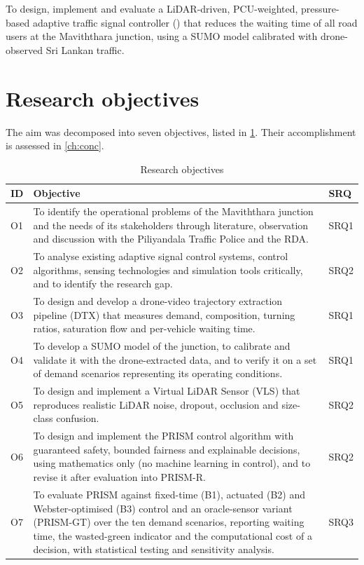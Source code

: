 To design, implement and evaluate a LiDAR-driven, PCU-weighted, pressure-based adaptive traffic signal controller (\prism{}) that reduces the waiting time of all road users at the Maviththara junction, using a SUMO model calibrated with drone-observed Sri Lankan traffic.

\section{Research objectives}\label{sec:intro-objectives}

The aim was decomposed into seven objectives, listed in \cref{tab:intro-objectives}. Their accomplishment is assessed in \cref{ch:conc}.

\begin{table}[htbp]
  \centering
  \caption{Research objectives}
  \label{tab:intro-objectives}
  \small
  \renewcommand{\arraystretch}{1.15}
  \begin{tabularx}{\textwidth}{@{}l X l@{}}
    \toprule
    \textbf{ID} & \textbf{Objective} & \textbf{SRQ} \\
    \midrule
    O1 & To identify the operational problems of the Maviththara junction and the needs of its stakeholders through literature, observation and discussion with the Piliyandala Traffic Police and the RDA. & SRQ1 \\
    O2 & To analyse existing adaptive signal control systems, control algorithms, sensing technologies and simulation tools critically, and to identify the research gap. & SRQ2 \\
    O3 & To design and develop a drone-video trajectory extraction pipeline (DTX) that measures demand, composition, turning ratios, saturation flow and per-vehicle waiting time. & SRQ1 \\
    O4 & To develop a SUMO model of the junction, to calibrate and validate it with the drone-extracted data, and to verify it on a set of demand scenarios representing its operating conditions. & SRQ1 \\
    O5 & To design and implement a Virtual LiDAR Sensor (VLS) that reproduces realistic LiDAR noise, dropout, occlusion and size-class confusion. & SRQ2 \\
    O6 & To design and implement the PRISM control algorithm with guaranteed safety, bounded fairness and explainable decisions, using mathematics only (no machine learning in control), and to revise it after evaluation into PRISM-R. & SRQ2 \\
    O7 & To evaluate PRISM against fixed-time (B1), actuated (B2) and Webster-optimised (B3) control and an oracle-sensor variant (PRISM-GT) over the ten demand scenarios, reporting waiting time, the wasted-green indicator and the computational cost of a decision, with statistical testing and sensitivity analysis. & SRQ3 \\
    \bottomrule
  \end{tabularx}
\end{table}


